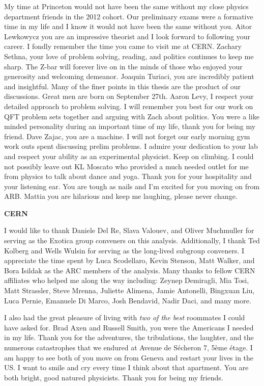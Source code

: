 My time at Princeton would not have been the same without my close physics department friends in the 2012 cohort. 
Our preliminary exams were a formative time in my life and I know it would not
 have been the same without you. 
Aitor Lewkowycz you are an impressive theorist and I look forward to following
your career. I fondly remember the time you came to visit me at CERN. 
 Zachary Sethna, your love of problem solving, reading, and politics continues to keep me sharp. The 
Z-bar will forever live on in the minds of those who enjoyed your generosity and welcoming demeanor. Joaquin Turiaci, you
are incredibly patient and insightful. Many of the finer points in this thesis are the product
of our discussions. Great men are born on September 27th. Aaron Levy, I respect your detailed approach to problem solving. I will remember you best for our work on QFT
problem sets together and arguing with Zach about politics. 
You were a like minded personality during an important time of my life,
 thank you for being my friend. Dave Zajac, you are a machine. I will not forget 
our early morning gym work outs spent discussing prelim problems.
I admire your dedication to your lab and respect your ability as an experimental physicist. Keep on climbing. I could not possibly leave out KL Moscato 
who provided a much needed outlet for me from physics to talk about dance and yoga. 
Thank you for your hospitality and your listening ear. You are tough as nails 
and I'm excited for you moving on from ARB. Mattia you are hilarious and keep 
me laughing, please never change.

\begin{center} \textbf{CERN} \end{center}

I would like to thank Daniele Del Re, Slava Valouev, and Oliver Muchmuller for 
serving as the Exotica group conveners on this analysis.
Additionally, I thank Ted Kolberg and Wells Wulsin for serving as the
long-lived subgroup conveners. I appreciate the time spent by Luca Scodellaro,
 Kevin Stenson, Matt Walker, and Bora Isildak as the ARC members of the analysis. 
Many thanks to fellow CERN affiliates who helped me along the way including: Zeynep Demiragli, Mia Tosi, Matt Strassler, Steve Mrenna, Juliette Alimena, Jamie Antonelli,
Bingxuan Liu, Luca Pernie, Emanuele Di Marco, Josh Bendavid, 
Nadir Daci, and many more.

I also had the great pleasure of living with \textit{two of the best} 
roommates I could have asked for. Brad Axen and Russell Smith, you were the
Americans I needed in my life. Thank you for the adventures, the tribulations,
the laughter, and the numerous catastrophes that we endured at Avenue de S\'echeron 7, 5\`eme \'etage. I am happy to see
 both of you move on from Geneva and restart
your lives in the US. I want to smile and cry every time I think about that 
apartment. You are both bright, good natured physicists. Thank you for being 
my friends.

